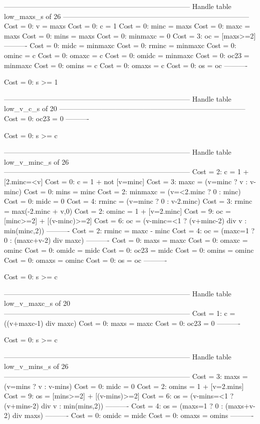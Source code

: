 --------------------------------------------------------------------------------
Handle table low_maxs_s of 26
--------------------------------------------------------------------------------
Cost =  0:  v       = maxs
Cost =  0:  c       = 1
Cost =  0:  minc    = maxs
Cost =  0:  maxc    = maxs
Cost =  0:  mins    = maxs
Cost =  0:  minmaxc = 0
Cost =  3:  oc      = [maxs>=2]
----------
Cost =  0:  midc    = minmaxc
Cost =  0:  rminc   = minmaxc
Cost =  0:  ominc   = c
Cost =  0:  omaxc   = c
Cost =  0:  omidc   = minmaxc
Cost =  0:  oc23    = minmaxc
Cost =  0:  omins   = c
Cost =  0:  omaxs   = c
Cost =  0:  os      = oc
----------

Cost =  0:  s >= 1

--------------------------------------------------------------------------------
Handle table low_v_c_s of 20
--------------------------------------------------------------------------------
Cost =  0:  oc23 = 0
----------

Cost =  0:  s >= c

--------------------------------------------------------------------------------
Handle table low_v_minc_s of 26
--------------------------------------------------------------------------------
Cost =  2:  c       = 1 + [2.minc=<v]
Cost =  0:  c       = 1 + not [v=minc]
Cost =  3:  maxc    = (v=minc ? v : v-minc)
Cost =  0:  mins    = minc
Cost =  2:  minmaxc = (v=<2.minc ? 0 : minc)
Cost =  0:  midc    = 0
Cost =  4:  rminc   = (v=minc ? 0 : v-2.minc)
Cost =  3:  rminc   = max(-2.minc + v,0)
Cost =  2:  ominc   = 1 + [v=2.minc]
Cost =  9:  oc      = [minc>=2] + [(v-minc)>=2]
Cost =  6:  oc      = (v-minc=<1 ? (v+minc-2) div v : min(minc,2))
----------
Cost =  2:  rminc   = maxc - minc
Cost =  4:  oc      = (maxc=1 ? 0 : (maxc+v-2) div maxc)
----------
Cost =  0:  maxs    = maxc
Cost =  0:  omaxc   = ominc
Cost =  0:  omidc   = midc
Cost =  0:  oc23    = midc
Cost =  0:  omins   = ominc
Cost =  0:  omaxs   = ominc
Cost =  0:  os      = oc
----------

Cost =  0:  s >= c

--------------------------------------------------------------------------------
Handle table low_v_maxc_s of 20
--------------------------------------------------------------------------------
Cost =  1:  c    = ((v+maxc-1) div maxc)
Cost =  0:  maxs = maxc
Cost =  0:  oc23 = 0
----------

Cost =  0:  s >= c

--------------------------------------------------------------------------------
Handle table low_v_mins_s of 26
--------------------------------------------------------------------------------
Cost =  3:  maxs  = (v=mins ? v : v-mins)
Cost =  0:  midc  = 0
Cost =  2:  omins = 1 + [v=2.mins]
Cost =  9:  os    = [mins>=2] + [(v-mins)>=2]
Cost =  6:  os    = (v-mins=<1 ? (v+mins-2) div v : min(mins,2))
----------
Cost =  4:  os    = (maxs=1 ? 0 : (maxs+v-2) div maxs)
----------
Cost =  0:  omidc = midc
Cost =  0:  omaxs = omins
----------

